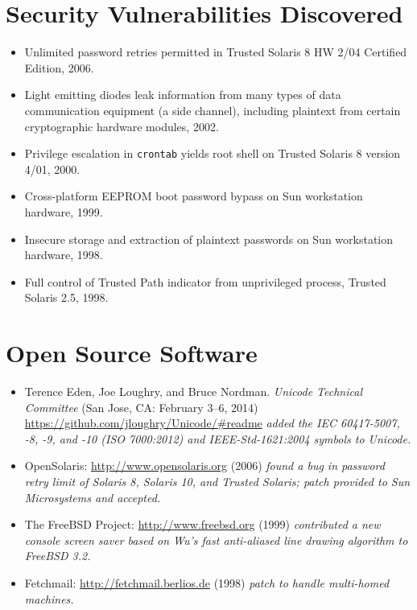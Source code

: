 \documentclass[12pt,twoside,letterpaper]{article}
\begin{document}
\setlength{\fboxsep}{0pt}

\vspace{-8mm}
\section*{Security Vulnerabilities Discovered}
\vspace{-2mm}
\begin{itemize}
	\item Unlimited password retries permitted in Trusted Solaris 8 HW 2/04
		Certified Edition, 2006.\vspace{-2mm}
	\item Light emitting diodes leak information from many types of data
		communication equipment (a side channel), including plaintext from
		certain cryptographic hardware modules, 2002.\vspace{-1.5mm}
	\item Privilege escalation in \verb,crontab, yields root shell on Trusted
		Solaris 8 version 4/01, 2000.\vspace{-2mm}
	\item Cross-platform EEPROM boot password bypass on Sun workstation
		hardware, 1999.\vspace{-2mm}
	\item Insecure storage and extraction of plaintext passwords on Sun workstation
		hardware, 1998.\vspace{-2mm}
	\item Full control of Trusted Path indicator from unprivileged process,
		Trusted Solaris 2.5, 1998.\vspace{-2mm}
\end{itemize}


\section*{Open Source Software}
\vspace{-2mm}
\begin{itemize}
	\item Terence Eden, Joe Loughry, and Bruce Nordman. \emph{Unicode
		Technical Committee} (San Jose, CA: February 3--6, 2014)
		\url{https://github.com/jloughry/Unicode/#readme} \emph{added
		the IEC 60417-5007, -8, -9, and -10 (ISO 7000:2012) and
		IEEE-Std-1621:2004 symbols to Unicode.}
	\item OpenSolaris: \url{http://www.opensolaris.org} (2006)
		\emph{found a bug in password retry limit of Solaris 8, Solaris 10,
		and Trusted Solaris; patch provided to Sun Microsystems and accepted.}
	\item The FreeBSD Project: \url{http://www.freebsd.org} (1999)
		\emph{contributed a new console screen saver based on Wu's fast
		anti-aliased line drawing algorithm to FreeBSD 3.2.}
	\item Fetchmail: \url{http://fetchmail.berlios.de} (1998)
		\emph{patch to handle multi-homed machines.}
\end{itemize}
\end{document}
